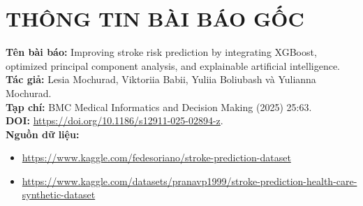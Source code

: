 \chapter*{THÔNG TIN BÀI BÁO GỐC}
\noindent\textbf{Tên bài báo:} Improving stroke risk prediction by integrating XGBoost, optimized principal component analysis, and explainable artificial intelligence.\\[4pt]
\textbf{Tác giả:} Lesia Mochurad, Viktoriia Babii, Yuliia Boliubash và Yulianna Mochurad.\\[4pt]
\textbf{Tạp chí:} BMC Medical Informatics and Decision Making (2025) 25:63.\\[4pt]
\textbf{DOI:} \url{https://doi.org/10.1186/s12911-025-02894-z}.\\[8pt]
\textbf{Nguồn dữ liệu:}
\begin{itemize}
	\item \url{https://www.kaggle.com/fedesoriano/stroke-prediction-dataset}
	\item \url{https://www.kaggle.com/datasets/pranavp1999/stroke-prediction-health-care-synthetic-dataset}
\end{itemize}

